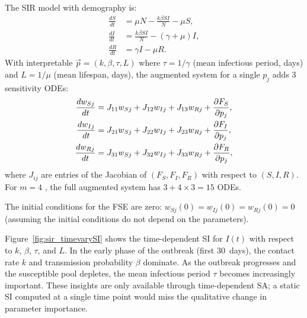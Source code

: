 The SIR model with demography is:
\begin{align}
  \frac{dS}{dt} &= \mu N - \frac{k\beta SI}{N} - \mu S, \label{eq:sirS}\\
  \frac{dI}{dt} &= \frac{k\beta SI}{N} - (\gamma + \mu)I, \label{eq:sirI}\\
  \frac{dR}{dt} &= \gamma I - \mu R. \label{eq:sirR}
\end{align}
With interpretable \POIs $\vec{p} = (k, \beta, \tau, L)$ where
$\tau = 1/\gamma$ (mean infectious period, days) and
$L = 1/\mu$ (mean lifespan, days), the augmented system
for a single \POI $p_j$ adds 3 sensitivity ODEs:
\begin{align}
  \frac{dw_{Sj}}{dt} &= J_{11}w_{Sj} + J_{12}w_{Ij} + J_{13}w_{Rj}
                         + \frac{\partial F_S}{\partial p_j}, \label{eq:sirFSE1}\\
  \frac{dw_{Ij}}{dt} &= J_{21}w_{Sj} + J_{22}w_{Ij} + J_{23}w_{Rj}
                         + \frac{\partial F_I}{\partial p_j}, \label{eq:sirFSE2}\\
  \frac{dw_{Rj}}{dt} &= J_{31}w_{Sj} + J_{32}w_{Ij} + J_{33}w_{Rj}
                         + \frac{\partial F_R}{\partial p_j}, \label{eq:sirFSE3}
\end{align}
where $J_{ij}$ are entries of the Jacobian of $(F_S, F_I, F_R)$
with respect to $(S, I, R)$.
For $m = 4$ \POIs, the full augmented system has $3 + 4\times3 = 15$ ODEs.

The initial conditions for the FSE are zero:
$w_{Sj}(0) = w_{Ij}(0) = w_{Rj}(0) = 0$
(assuming the initial conditions do not depend on the parameters).

Figure~\ref{fig:sir_timevarySI} shows the time-dependent SI for $I(t)$
with respect to $k$, $\beta$, $\tau$, and $L$.
In the early phase of the outbreak (first 30~days), the contact
rate $k$ and transmission probability $\beta$ dominate.
As the outbreak progresses and the susceptible pool depletes,
the mean infectious period $\tau$ becomes increasingly important.
These insights are only available through time-dependent SA;
a static SI computed at a single time point would miss the
qualitative change in parameter importance.

